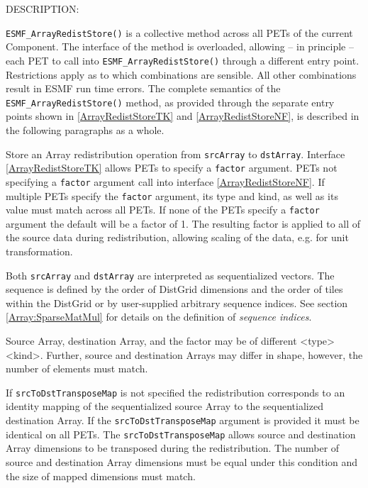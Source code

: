 {\sf DESCRIPTION:\\ }


   \label{ArrayRedistStoreTK}
   {\tt ESMF\_ArrayRedistStore()} is a collective method across all PETs of the
   current Component. The interface of the method is overloaded, allowing 
   -- in principle -- each PET to call into {\tt ESMF\_ArrayRedistStore()}
   through a different entry point. Restrictions apply as to which combinations
   are sensible. All other combinations result in ESMF run time errors. The
   complete semantics of the {\tt ESMF\_ArrayRedistStore()} method, as provided
   through the separate entry points shown in \ref{ArrayRedistStoreTK} and
   \ref{ArrayRedistStoreNF}, is described in the following paragraphs as a whole.
  
   Store an Array redistribution operation from {\tt srcArray} to {\tt dstArray}.
   Interface \ref{ArrayRedistStoreTK} allows PETs to specify a {\tt factor}
   argument. PETs not specifying a {\tt factor} argument call into interface
   \ref{ArrayRedistStoreNF}. If multiple PETs specify the {\tt factor} argument,
   its type and kind, as well as its value must match across all PETs. If none
   of the PETs specify a {\tt factor} argument the default will be a factor of
   1. The resulting factor is applied to all of the source data during
   redistribution, allowing scaling of the data, e.g. for unit transformation.
    
   Both {\tt srcArray} and {\tt dstArray} are interpreted as sequentialized 
   vectors. The sequence is defined by the order of DistGrid dimensions and the
   order of tiles within the DistGrid or by user-supplied arbitrary sequence
   indices. See section \ref{Array:SparseMatMul} for details on the definition
   of {\em sequence indices}.
  
   Source Array, destination Array, and the factor may be of different
   <type><kind>. Further, source and destination Arrays may differ in shape,
   however, the number of elements must match. 
    
   If {\tt srcToDstTransposeMap} is not specified the redistribution corresponds
   to an identity mapping of the sequentialized source Array to the
   sequentialized destination Array. If the {\tt srcToDstTransposeMap}
   argument is provided it must be identical on all PETs. The
   {\tt srcToDstTransposeMap} allows source and destination Array dimensions to
   be transposed during the redistribution. The number of source and destination
   Array dimensions must be equal under this condition and the size of mapped
   dimensions must match.
    
